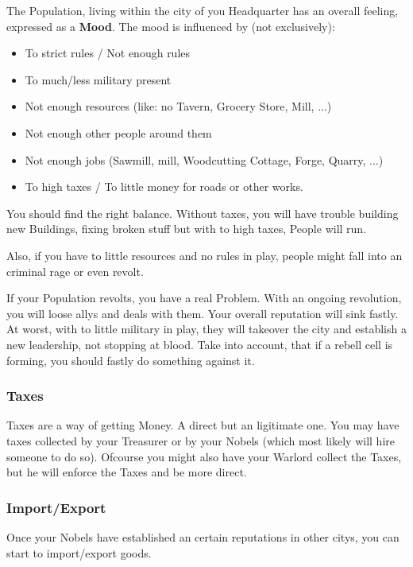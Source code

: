 \documentclass[10pt,twoside,twocolumn,openany]{book}
\begin{document}
The Population, living within the city of you Headquarter has an overall feeling, expressed as a \textbf{Mood}. The mood is influenced by (not exclusively):
\begin{itemize}
\item To strict rules / Not enough rules
\item To much/less military present
\item Not enough resources (like: no Tavern, Grocery Store, Mill, ...)
\item Not enough other people around them
\item Not enough jobs (Sawmill, mill, Woodcutting Cottage, Forge, Quarry, ...)
\item To high taxes / To little money for roads or other works.
\end{itemize}

You should find the right balance. Without taxes, you will have trouble building new Buildings, fixing broken stuff but with to high taxes, People will run.

Also, if you have to little resources and no rules in play, people might fall into an criminal rage or even revolt. 

If your Population revolts, you have a real Problem. With an ongoing revolution, you will loose allys and deals with them. Your overall reputation will sink fastly. At worst, with to little military in play, they will takeover the city and establish a new leadership, not stopping at blood. Take into account, that if a rebell cell is forming, you should fastly do something against it.

\subsubsection{Taxes}

Taxes are a way of getting Money. A direct but an ligitimate one. You may have taxes collected by your Treasurer or by your Nobels (which most likely will hire someone to do so). Ofcourse you might also have your Warlord collect the Taxes, but he will enforce the Taxes and be more direct.

\subsubsection{Import/Export}

Once your Nobels have established an certain reputations in other citys, you can start to import/export goods.
\end{document}
